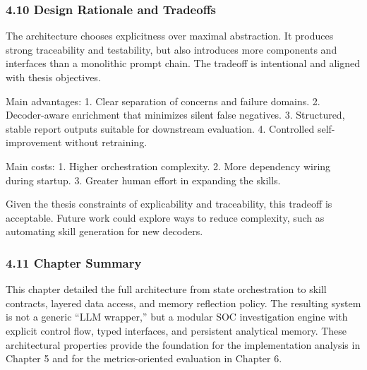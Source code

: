 \documentclass[
]{article}
\begin{document}
\subsubsection{4.10 Design Rationale and
Tradeoffs}\label{design-rationale-and-tradeoffs}

The architecture chooses explicitness over maximal abstraction. It
produces strong traceability and testability, but also introduces more
components and interfaces than a monolithic prompt chain. The tradeoff
is intentional and aligned with thesis objectives.

Main advantages: 1. Clear separation of concerns and failure domains. 2.
Decoder-aware enrichment that minimizes silent false negatives. 3.
Structured, stable report outputs suitable for downstream evaluation. 4.
Controlled self-improvement without retraining.

Main costs: 1. Higher orchestration complexity. 2. More dependency
wiring during startup. 3. Greater human effort in expanding the skills.

Given the thesis constraints of explicability and traceability, this
tradeoff is acceptable. Future work could explore ways to reduce
complexity, such as automating skill generation for new decoders.

\subsubsection{4.11 Chapter Summary}\label{chapter-summary}

This chapter detailed the full architecture from state orchestration to
skill contracts, layered data access, and memory reflection policy. The
resulting system is not a generic ``LLM wrapper,'' but a modular SOC
investigation engine with explicit control flow, typed interfaces, and
persistent analytical memory. These architectural properties provide the
foundation for the implementation analysis in Chapter 5 and for the
metrics-oriented evaluation in Chapter 6.
\end{document}
